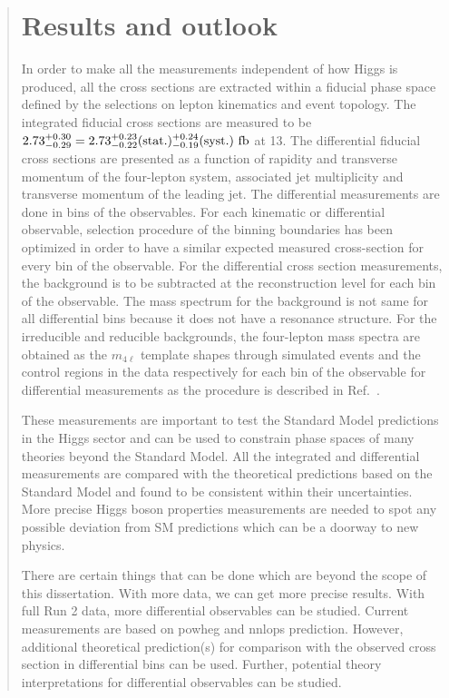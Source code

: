 \begin{abstract}
\section{Results and outlook}	
	\par In order to make all the measurements independent of how Higgs is produced, all the cross sections are extracted within a fiducial phase space defined by the selections on lepton kinematics and event topology. The integrated fiducial cross sections are measured to be $2.73^{+0.30}_{-0.29}=2.73^{+0.23}_{-0.22}({\rm stat.})^{+0.24}_{-0.19}({\rm syst.})~{\rm fb}$ at 13\TeV.
The differential fiducial cross sections are presented as a function of %
	rapidity and transverse momentum of the four-lepton system, associated jet multiplicity and transverse momentum of the leading jet.
The differential measurements are done in bins of the observables. For each kinematic or differential observable, selection procedure of the binning boundaries has been optimized in order to have a similar expected measured cross-section for every bin of the observable. For the differential cross section measurements, the background is to be subtracted at the reconstruction level for each bin
of the observable. The mass spectrum for the background is not same for all differential bins because it does not have a resonance structure. For the irreducible and reducible backgrounds, the four-lepton mass spectra are obtained as the $m_{4\ell}$ template shapes through simulated events and the control regions in the data respectively for each bin of the observable for differential measurements as the procedure is described in Ref.~\cite{Chatrchyan:2013mxa}.
\par
	These measurements are important to test the Standard Model predictions in the Higgs sector and can be used to constrain phase spaces of many theories beyond the Standard Model.  All the integrated and differential measurements are compared with the theoretical predictions based on the Standard Model and found to be consistent within their uncertainties. More precise Higgs boson properties measurements are needed to spot any possible deviation
from SM predictions which can be a doorway to new physics.

There are certain things that can be done which are beyond the scope of this dissertation. With more data, we can get more precise results. With full Run 2 data, more differential observables can be studied. Current measurements are based on {\sc powheg} and {\sc nnlops} prediction. However, additional theoretical prediction(s) for comparison with the observed cross section in differential bins can be used. Further, potential theory interpretations for differential observables can be studied.
\end{abstract}
